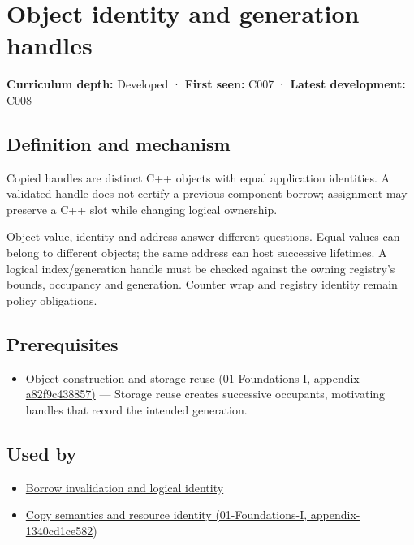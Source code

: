 \hypertarget{appendix-f1581457d322}{}
\section{Object identity and generation handles}\label{appendix-f1581457d322-object-identity-and-generation-handles}

\textbf{Curriculum depth:} Developed · \textbf{First seen:} C007 · \textbf{Latest development:} C008

\subsection{Definition and mechanism}\label{appendix-f1581457d322-definition-and-mechanism}

Copied handles are distinct C++ objects with equal application identities. A validated handle does not certify a previous component borrow; assignment may preserve a C++ slot while changing logical ownership.

Object value, identity and address answer different questions. Equal values can belong to different objects; the same address can host successive lifetimes. A logical index/generation handle must be checked against the owning registry's bounds, occupancy and generation. Counter wrap and registry identity remain policy obligations.

\subsection{Prerequisites}\label{appendix-f1581457d322-prerequisites}

\begin{itemize}
\tightlist
\item
  \href{../01-Foundations-I/main.pdf\#nameddest=appendix-a82f9c438857}{Object construction and storage reuse (01-Foundations-I, appendix-a82f9c438857)} --- Storage reuse creates successive occupants, motivating handles that record the intended generation.
\end{itemize}

\subsection{Used by}\label{appendix-f1581457d322-used-by}

\begin{itemize}
\tightlist
\item
  \hyperref[appendix-f9b8b9188c7f]{Borrow invalidation and logical identity}
\item
  \href{../01-Foundations-I/main.pdf\#nameddest=appendix-1340cd1ce582}{Copy semantics and resource identity (01-Foundations-I, appendix-1340cd1ce582)}
\end{itemize}

